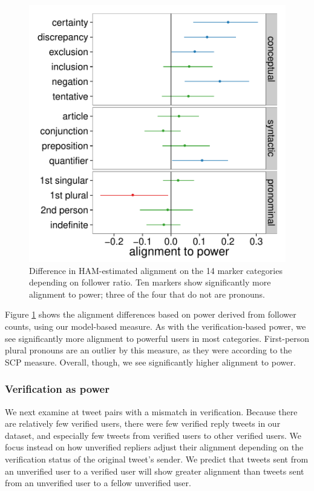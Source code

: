 \documentclass{acm_proc_article-sp}
\begin{document}
\begin{figure}[t]
\centering
\includegraphics[width=.9\columnwidth]{graphics/www2016_ourpowerdiff_fratio_final95.pdf}
\caption{Difference in HAM-estimated alignment on the 14 marker categories depending on follower ratio. Ten markers show significantly more alignment to power; three of the four that do not are pronouns.}\label{fig:our-fratio}
\end{figure}

Figure \ref{fig:our-fratio} shows the alignment differences based on power derived from follower counts, using our model-based measure.  As with the verification-based power, we see significantly more alignment to powerful users in most categories. First-person plural pronouns are an outlier by this measure, as they were according to the SCP measure.  Overall, though, we see significantly higher alignment to power.

\subsubsection{Verification as power} 

We next examine at tweet pairs with a mismatch in verification.  Because there are relatively few verified users, there were few verified reply tweets in our dataset, and especially few tweets from verified users to other verified users. We focus instead on how unverified repliers adjust their alignment depending on the verification status of the original tweet's sender.  We predict that tweets sent from an unverified user to a verified user will show greater alignment than tweets sent from an unverified user to a fellow unverified user.  
\end{document}
